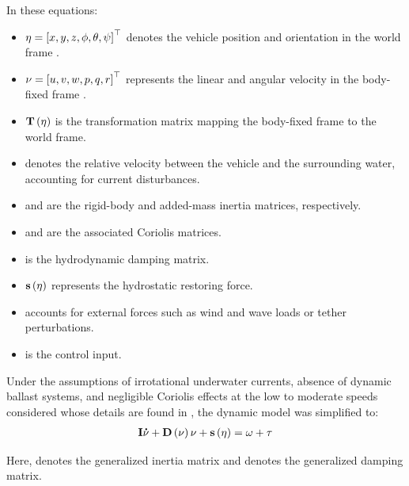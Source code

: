 In these equations:
\begin{itemize}
	\item $\vect{\eta} = \left[\scal{x}, \scal{y}, \scal{z}, \scal{\phi}, \scal{\theta}, \scal{\psi}\right]^{\top}$ denotes the vehicle position and orientation in the world frame .
	\item $\vect{\nu} = \left[\scal{u}, \scal{v}, \scal{w}, \scal{p}, \scal{q}, \scal{r}\right]^{\top}$ represents the linear and angular velocity in the body-fixed frame .
	\item $\matr{T}\left(\vect{\eta}\right)$ is the transformation matrix mapping the body-fixed frame to the world frame.
	\item {} denotes the relative velocity between the vehicle and the surrounding water, accounting for current disturbances.
	\item {} and  are the rigid-body and added-mass inertia matrices, respectively.
	\item {} and  are the associated Coriolis matrices.
	\item {} is the hydrodynamic damping matrix.
	\item $\vect{s}\left(\vect{\eta}\right)$ represents the hydrostatic restoring force.
	\item \vect{\omega} accounts for external forces such as wind and wave loads or tether perturbations.
	\item \vect{\tau} is the control input.
\end{itemize}

Under the assumptions of irrotational underwater currents, absence of dynamic ballast systems, and
negligible Coriolis effects at the low to moderate speeds considered whose details are found in
\cite{fossenHandbookMarineCraft2011}, the dynamic model was simplified to:
\begin{align}
	\matr{I} \vect{\dot{\nu}}
	+ \matr{D}\left(\vect{\nu}\right) \vect{\nu}
	+ \vect{s}\left(\vect{\eta}\right)
	= \vect{\omega} + \vect{\tau}
	\label{rcc_rcm_srd_dynamics_simple}
\end{align}

Here,  denotes the generalized inertia matrix and  denotes the generalized damping
matrix.

